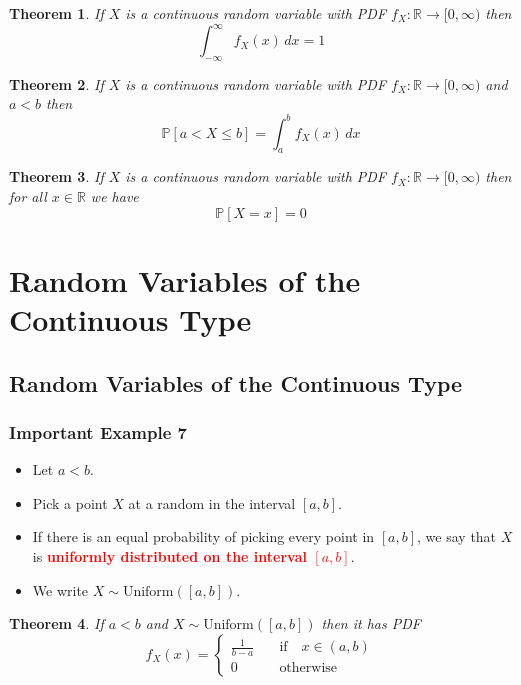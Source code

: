 \documentclass{article}
\newcommand{\PP}{\mathbb{P}}
\newcommand{\R}{\mathbb{R}}
\newcommand{\bfred}[1]{\textcolor{red}{\textbf{#1}}}
\theoremstyle{plain}
\newtheorem{thm}{Theorem}[section]
\theoremstyle{definition}
\theoremstyle{remark}
\begin{document}
\begin{thm}
    If $X$ is a continuous random variable with PDF $f_X:\R\rightarrow[0,\infty)$ then \[\int_{-\infty}^\infty f_X(x)\,dx = 1\]
\end{thm}

\begin{thm}
    If $X$ is a continuous random variable with PDF $f_X:\R\rightarrow[0,\infty)$ and $a<b$ then \[\PP[a < X \leq b] = \int_{a}^{b}f_X(x)\,dx\]
\end{thm}

\begin{thm}
    If $X$ is a continuous random variable with PDF $f_X:\R\rightarrow[0,\infty)$ then for all $x\in\R$ we have \[\PP[X=x]=0\]
\end{thm}

\section{Random Variables of the Continuous Type}

\subsection{Random Variables of the Continuous Type}

\subsubsection*{Important Example 7}

\begin{tcolorbox}[title = Uniform Distribution, colback = SkyBlue!5!white,colframe = SkyBlue!75!black]
    \begin{itemize}
        \item Let $a<b$.
        \item Pick a point $X$ at a random in the interval $[a,b]$.
        \item If there is an equal probability of picking every point in $[a,b]$, we say that $X$ is \bfred{uniformly distributed on the interval $[a,b]$}.
        \item We write $X \sim \text{Uniform}([a,b])$.
    \end{itemize}
\end{tcolorbox}

\begin{thm}
    If $a<b$ and $X \sim \text{Uniform}([a,b])$ then it has PDF \[f_X(x) = 
    \begin{cases}
        \frac{1}{b-a} \quad &\text{if} \quad x\in(a,b) \\
        0 \quad &\text{otherwise}
    \end{cases}\]
\end{thm}
\end{document}
